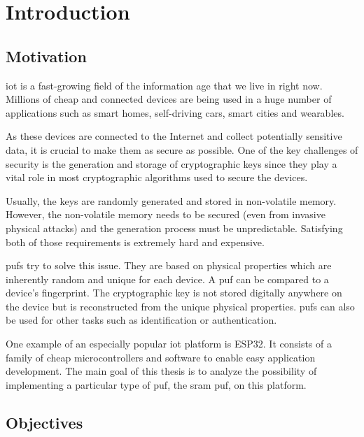 \chapter*{Introduction}\label{sec:introduction}
{}

\section*{Motivation}
{}

\Gls{iot} is a fast-growing field of the information age that we live in right now. Millions of cheap and connected devices are being used in a huge number of applications such as smart homes, self-driving cars, smart cities and wearables.

As these devices are connected to the Internet and collect potentially sensitive data, it is crucial to make them as secure as possible. One of the key challenges of security is the generation and storage of cryptographic keys since they play a vital role in most cryptographic algorithms used to secure the devices.

Usually, the keys are randomly generated and stored in non-volatile memory. However, the non-volatile memory needs to be secured (even from invasive physical attacks) and the generation process must be unpredictable. Satisfying both of those requirements is extremely hard and expensive.

\Glspl{puf} try to solve this issue. They are based on physical properties which are inherently random and unique for each device. A \gls{puf} can be compared to a device's fingerprint. The cryptographic key is not stored digitally anywhere on the device but is reconstructed from the unique physical properties. \Glspl{puf} can also be used for other tasks such as identification or authentication.

One example of an especially popular \gls{iot} platform is ESP32. It consists of a family of cheap microcontrollers and software to enable easy application development. The main goal of this thesis is to analyze the possibility of implementing a particular type of \gls{puf}, the \gls{sram} \gls{puf}, on this platform.

\section*{Objectives}
{}

